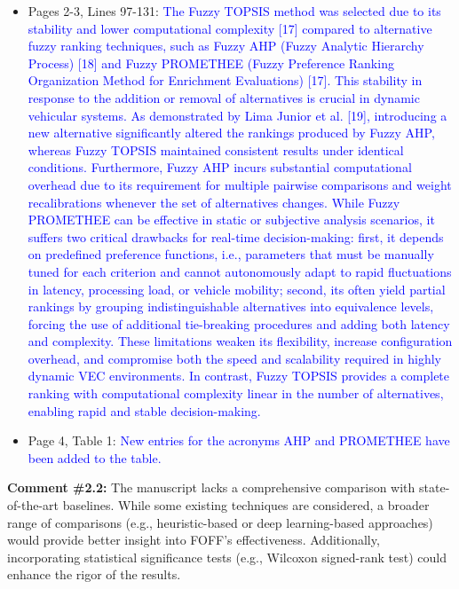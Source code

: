 \begin{itemize}
    \item Pages 2-3, Lines 97-131: \textcolor{blue}{The Fuzzy TOPSIS method was selected due to its stability and lower computational complexity [17] compared to alternative fuzzy ranking techniques, such as Fuzzy AHP (Fuzzy Analytic Hierarchy Process) [18] and Fuzzy PROMETHEE (Fuzzy Preference Ranking Organization Method for Enrichment Evaluations) [17]. This stability in response to the addition or removal of alternatives is crucial in dynamic vehicular systems. As demonstrated by Lima Junior et al. [19], introducing a new alternative significantly altered the rankings produced by Fuzzy AHP, whereas Fuzzy TOPSIS maintained consistent results under identical conditions. Furthermore, Fuzzy AHP incurs substantial computational overhead due to its requirement for multiple pairwise comparisons and weight recalibrations whenever the set of alternatives changes. While Fuzzy PROMETHEE can be effective in static or subjective analysis scenarios, it suffers two critical drawbacks for real-time decision-making: first, it depends on predefined preference functions, i.e., parameters that must be manually tuned for each criterion and cannot autonomously adapt to rapid fluctuations in latency, processing load, or vehicle mobility; second, its often yield partial rankings by grouping indistinguishable alternatives into equivalence levels, forcing the use of additional tie-breaking procedures and adding both latency and complexity. These limitations weaken its flexibility, increase configuration overhead, and compromise both the speed and scalability required in highly dynamic VEC environments. In contrast, Fuzzy TOPSIS provides a complete ranking with computational complexity linear in the number of alternatives, enabling rapid and stable decision-making.}
    \item Page 4, Table 1: \textcolor{blue}{New entries for the acronyms AHP and PROMETHEE have been added to the table.}
\end{itemize}

\vspace{\baselineskip}

\begin{mdframed}[style=review] 
\textbf{Comment \#2.2:} The manuscript lacks a comprehensive comparison with state-of-the-art baselines. While some existing techniques are considered, a broader range of comparisons (e.g., heuristic-based or deep learning-based approaches) would provide better insight into FOFF's effectiveness. Additionally, incorporating statistical significance tests (e.g., Wilcoxon signed-rank test) could enhance the rigor of the results.
\end{mdframed}

